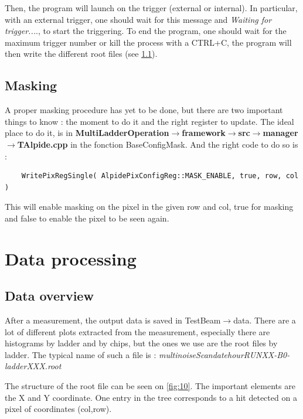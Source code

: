\documentclass[12pt,oneside,a4]{article}
\begin{document}
Then, the program will launch on the trigger (external or internal). In particular, with an external trigger, one should wait for this message and \textit{Waiting for trigger...}., to start the triggering. 
To end the program, one should wait for the maximum trigger number or kill the process with a CTRL+C, the program will then write the different root files (see \ref{Data overview}).


       
    \subsection{Masking}
A proper masking procedure has yet to be done, but there are two important things to know : the moment to do it and the right register to update. The ideal place to do it, is in \textbf{MultiLadderOperation$\rightarrow$framework$\rightarrow$src$\rightarrow$manager$\rightarrow$TAlpide.cpp} in the fonction BaseConfigMask. And the right code to do so is : 
\begin{verbatim}
    WritePixRegSingle( AlpidePixConfigReg::MASK_ENABLE, true, row, col )
\end{verbatim}
This will enable masking on the pixel in the given row and col, true for masking and false to enable the pixel to be seen again.
\section{Data processing}
    \subsection{Data overview}\label{Data overview}
    After a measurement, the output data is saved in Test\textunderscore Beam$\rightarrow$data. 
    There are a lot of different plots extracted from the measurement, especially there are histograms by ladder and by chips, but the ones we use are the root files by ladder. The typical name of such a file is : \textit{multinoiseScan\textunderscore date\textunderscore hour\textunderscore RUNXX-B0-ladderXXX.root}
    
    The structure of the root file can be seen on \ref{fig:10}. The important elements are the X and Y coordinate. One entry in the tree corresponds to a hit detected on a pixel of coordinates (col,row).
    
\end{document}

